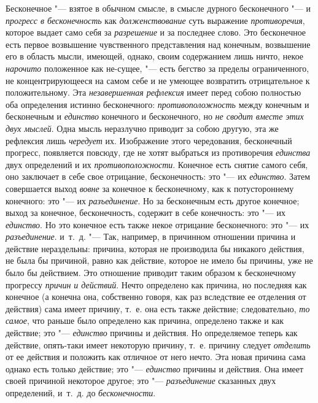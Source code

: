 
Бесконечное "--- взятое в обычном смысле, в смысле дурного бесконечного "--- и
{\em прогресс в бесконечность} как {\em долженствование} суть выражение
{\em противоречия}, которое выдает само себя за
{\em разрешение} и за последнее слово. Это бесконечное
есть первое возвышение чувственного представления над конечным, возвышение
его в область мысли, имеющей, однако, своим содержанием лишь ничто, некое
{\em нарочито} положенное как не-сущее, "--- есть бегство
за пределы ограниченного, не концентрирующееся на самом себе и не умеющее
возвратить отрицательное к положительному. Эта
{\em незавершенная рефлексия} имеет перед собою
полностью оба определения истинно бесконечного:
{\em противоположность} между конечным и бесконечным и
{\em единство} конечного и бесконечного, но
{\em не сводит вместе этих двух мыслей}. Одна мысль
неразлучно приводит за собою другую, эта же рефлексия лишь
{\em чередует} их. Изображение этого чередования,
бесконечный прогресс, появляется повсюду, где не хотят выбраться из
противоречия {\em единства} двух определений и их
{\em противоположности}. Конечное есть снятие самого
себя, оно заключает в себе свое отрицание, бесконечность: это "--- их
{\em единство}. Затем совершается выход
{\em вовне} за конечное к бесконечному, как к
потустороннему конечного: это "--- их {\em разъединение}.
Но за бесконечным есть другое конечное; выход за конечное, бесконечность,
содержит в себе конечность: это "--- их {\em единство}. Но
это конечное есть также некое отрицание бесконечного: это "--- их
{\em разъединение}. и~т.~д. "--- Так, например, в
причинном отношении причина и действие нераздельны: причина, которая не
производила бы никакого действия, не была бы причиной, равно как действие,
которое не имело бы причины, уже не было бы действием. Это отношение
приводит таким образом к бесконечному прогрессу
{\em причин и действий}. Нечто определено как причина,
но последняя как конечное (а конечна она, собственно говоря, как раз
вследствие ее отделения от действия) сама имеет причину, т.~е. она есть
также действие; следовательно, {\em то самое}, что
раньше было определено как причина, определено также и как действие; это
"--- {\em единство} причины и действия. Но определяемое
теперь как действие, опять-таки имеет некоторую причину, т.~е. причину
следует {\em отделить} от ее действия и положить как
отличное от него нечто. Эта новая причина сама однако есть только действие;
это "--- {\em единство} причины и действия. Она имеет
своей причиной некоторое другое; это
"--- {\em разъединение} сказанных двух определений,
и~т.~д. до {\em бесконечности}.

